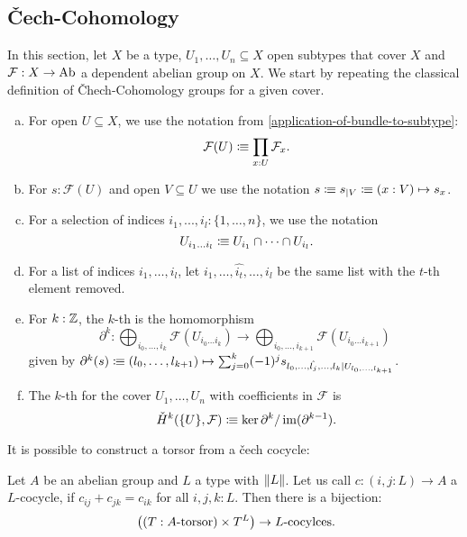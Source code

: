 \subsection{Čech-Cohomology}

In this section, let $X$ be a type, $U_1,\dots,U_n\subseteq X$ open subtypes that cover $X$
and $\mathcal F:X\to \operatorname{Ab}$ a dependent abelian group on $X$.
We start by repeating the classical definition of \v{C}hech-Cohomology groups for a given cover.

\begin{definition}%
  \label{chech-complex}
  \begin{enumerate}[(a)]
  \item {} For open $U\subseteq X$, we use the notation from \cref{application-of-bundle-to-subtype}:
    \[
      \mathcal F(U)\colonequiv \prod_{x:U}\mathcal F_x\rlap{.}
    \]
  \item For $s:\mathcal F(U)$ and open $V\subseteq U$ we use the notation $s\vcentcolon\mspace{-1.2mu}\equiv s_{|V} \vcentcolon\mspace{-1.2mu}\equiv (x:V)\mapsto s_x$.
  \item {}For a selection of indices $i_1,...,i_l:\{1,\dots,n\}$, we use the notation
    \[
      U_{i_1\dots i_l}\colonequiv U_{i_1}\cap\dots\cap U_{i_l}\rlap{.}
    \]
  \item For a list of indices $i_1,\dots,i_l$, let $i_1,\dots,\hat{i_t},\dots,i_l$ be the same list with the $t$-th element removed.
  \item For $k:\mathbb{Z}$, the $k$-th  is the homomorphism
    \[
      \partial^k:\bigoplus_{i_0,\dots,i_k}\mathcal F(U_{i_0\dots i_k})\to \bigoplus_{i_0,\dots,i_{k+1}}\mathcal F(U_{i_0\dots i_{k+1}})
    \]
    given by $\partial^k(s)\vcentcolon\mspace{-1.2mu}\equiv (l_0,\dots,l_{k+1}) \mapsto \sum_{j=0}^k (-1)^j s_{l_0,\dots,\hat{l_j},\dots,l_k|U_{l_0,\dots,l_{k+1}}}$.
  \item The $k$-th  for the cover $U_1,\dots,U_n$ with coefficients in $\mathcal F$ is
    \[
      \check{H}^k(\{U\},\mathcal F)\colonequiv \ker\partial^{k} / \im(\partial^{k-1})\rlap{.}
    \]
  \end{enumerate}
\end{definition}

It is possible to construct a torsor from a \v{c}ech cocycle:

\begin{lemma}%
  \label{deligne-construction}
  Let $A$ be an abelian group and $L$ a type with $\lVert L \rVert$.
  Let us call $c:(i,j:L)\to A$ a $L$-cocycle, if $c_{ij}+c_{jk}=c_{ik}$ for all $i,j,k:L$.
  Then there is a bijection:
  \[
    \left((T:\text{$A$-torsor})\times T^L\right) \to \text{$L$-cocylces}
    \rlap{.}
  \]
\end{lemma}

